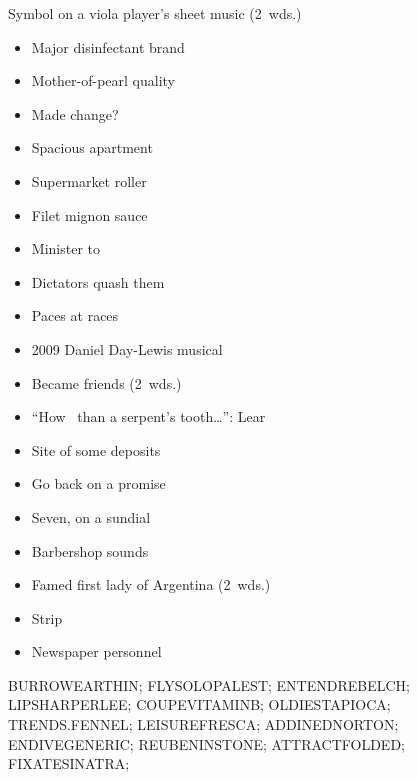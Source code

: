{\begin{itemize}
        Symbol on a viola player's sheet music (2~wds.)
    \end{itemize}
  \item
    \begin{itemize}
      \item
        Major disinfectant brand
      \item
        Mother-of-pearl quality
      \item
        Made change?
      \item
        Spacious apartment
      \item
        Supermarket roller
      \item
        Filet mignon sauce
    \end{itemize}
  \item
    \begin{itemize}
      \item
        Minister to
      \item
        Dictators quash them
      \item
        Paces at races
      \item
        2009 Daniel Day-Lewis musical
      \item
        Became friends (2~wds.)
    \end{itemize}
  \item
    \begin{itemize}
      \item
        ``How \blank\ than a serpent's tooth\ldots'': Lear
      \item
        Site of some deposits
      \item
        Go back on a promise
      \item
        Seven, on a sundial
      \item
        Barbershop sounds
    \end{itemize}
  \item
    \begin{itemize}
      \item
        Famed first lady of Argentina (2~wds.)
      \item
        Strip
    \end{itemize}
  \item
    \begin{itemize}
      \item
        Newspaper personnel
    \end{itemize}
}{%
  \puzzlerow BURROWEARTHIN;
  \puzzlerow FLYSOLOPALEST;
  \puzzlerow ENTENDREBELCH;
  \puzzlerow LIPSHARPERLEE;
  \puzzlerow COUPEVITAMINB;
  \puzzlerow OLDIESTAPIOCA;
  \puzzlerow TRENDS.FENNEL;
  \puzzlerow LEISUREFRESCA;
  \puzzlerow ADDINEDNORTON;
  \puzzlerow ENDIVEGENERIC;
  \puzzlerow REUBENINSTONE;
  \puzzlerow ATTRACTFOLDED;
  \puzzlerow FIXATESINATRA;
}
